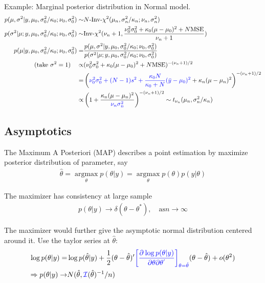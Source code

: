 \begin{itemize}[topsep=2pt,itemsep=0pt]
    Example: Marginal posterior distribution in Normal model.
    \begin{align*}
        p(\mu ,\sigma ^2|y,\mu _0, \sigma _0^2/\kappa_0; \nu _0, \sigma _0^2)\sim&N\text{-}\mathrm{ Inv }\text{-}\chi^2(\mu _n, \sigma _n^2/\kappa _n; \nu _n,\sigma _n^2)\\
        p(\sigma ^2|\mu ;y,\mu _0, \sigma _0^2/\kappa_0; \nu _0, \sigma _0^2)\sim & \mathrm{ Inv }\text{-}\chi^2(\nu _n+1, \dfrac{ \nu _0^2\sigma _0^2+\kappa _0(\mu -\mu _0)^2+ N\mathrm{ MSE }  }{ \nu _n+1 } )  \\
        p(\mu |y,\mu _0, \sigma _0^2/\kappa_0; \nu _0, \sigma _0^2)=&\dfrac{ p(\mu ,\sigma ^2|y,\mu _0, \sigma _0^2/\kappa_0; \nu _0, \sigma _0^2) }{ p(\sigma ^2| \mu ;y,\mu _0, \sigma _0^2/\kappa_0; \nu _0, \sigma _0^2) } \\
        (\text{take }\sigma ^2=1)\quad \propto&(\nu _0^2\sigma _0^2+\kappa _0(\mu -\mu _0)^2+ N\mathrm{ MSE } )^{-( \nu _n+1 )/2}\\
        =&\left( {\color{blue}\nu _0^2\sigma _0^2+(N-1)s^2+\dfrac{ \kappa _0N }{ \kappa _0+N }(\bar{y}-\mu _0)^2} + \kappa _n(\mu -\mu_n)^2  \right)^{-( \nu _n+1 )/2}\\
        \propto& \left(1+\dfrac{ \kappa _n(\mu -\mu _n)^2 }{ \color{blue}\nu _n\sigma _n^2 } \right)^{-( \nu _n+1 )/2}\sim t_{\nu _n}(\mu _n, \sigma _n^2/\kappa _n)
    \end{align*}

\end{itemize}

    

\subsection{Asymptotics}
The Maximum A Posteriori (MAP) describes a point estimation by maximize posterior distribution of parameter, say
\begin{align*}
    \hat{\theta }= \mathop{ \arg\max }\limits_{\theta } p(\theta |y)=\mathop{ \arg\max }\limits_{\theta }p(\theta )p(y|\theta )
\end{align*}

The maximizer has consistency at large sample
\begin{align*}
    p(\theta |y)\to \delta (\theta -\theta ^*),\quad \text{as}n\to \infty 
\end{align*}

The maximizer would further give the asymptotic normal distribution centered around it. Use the taylor series at $ \hat{\theta } $:
\begin{align*}
    \log p(\theta |y)=&\log p(\hat{\theta }|y)+\dfrac{ 1 }{ 2 } (\theta -\hat{\theta })'{\color{blue}\left[\dfrac{\partial^{} \log p(\theta |y) }{\partial \theta \partial\theta ^{'} }\right]_{\theta =\hat{\theta }}}(\theta -\hat{\theta })+o(\theta ^2) \\
    \Rightarrow p(\theta |y)\to& N(\hat{\theta }, {\color{blue}\mathcal{I}}(\hat{\theta })^{-1}/n)
\end{align*}

